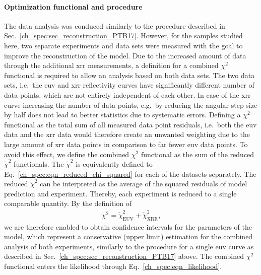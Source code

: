 \paragraph{Optimization functional and procedure} 
The data analysis was conduced similarly to the procedure described in Sec.~\ref{ch_spec:sec_reconstruction_PTB17}. However, for the samples studied here, two separate experiments and data sets were measured with the goal to improve the reconstruction of the model. Due to the increased amount of data through the additional \gls{xrr} measurements, a definition for a combined $\chi^2$ functional is required to allow an analysis based on both data sets. The two data sets, i.e.~the \gls{euv} and \gls{xrr} reflectivity curves have significantly different number of data points, which are not entirely independent of each other. In case of the \gls{xrr} curve increasing the number of data points, e.g.~by reducing the angular step size by half does not lead to better statistics due to systematic errors. Defining a $\chi^2$ functional as the total sum of all measured data point residuals, i.e.~both the \gls{euv} data and the \gls{xrr} data would therefore create an unwanted weighting due to the large amount of \gls{xrr} data points in comparison to far fewer \gls{euv} data points. To avoid this effect, we define the combined $\chi^2$ functional as the sum of the reduced $\tilde{\chi}^2$ functionals. The $\tilde{\chi}^2$ is equivalently defined to Eq.~\eqref{ch_spec:eqn_reduced_chi_squared} for each of the datasets separately. The reduced $\tilde{\chi}^2$ can be interpreted as the average of the squared residuals of model prediction and experiment. Thereby, each experiment is reduced to a single comparable quantity. By the definition of
\begin{align}
\chi^2 = \tilde{\chi}^2_\text{EUV} +\tilde{\chi}^2_\text{XRR} \text{,}
\label{ch_spec:eqn_Mo_Si_C_total_chi_2}
\end{align}
we are therefore enabled to obtain confidence intervals for the parameters of the model, which represent a conservative (upper limit) estimation for the combined analysis of both experiments, similarly to the procedure for a single \gls{euv} curve as described in Sec.~\ref{ch_spec:sec_reconstruction_PTB17} above. The combined $\chi^2$ functional enters the likelihood through Eq.~\ref{ch_spec:eqn_likelihood}.

